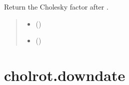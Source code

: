 \documentclass[a4paper,11pt,english]{sphinxmanual}
\begin{document}
\begin{fulllineitems}
\label{\detokenize{generated/cholrot.rank1_update:cholrot.rank1_update}}
\pysigstartsignatures
\pysiglinewithargsret
{}
{\sphinxparamcomma {}\sphinxparamcomma {}}
{}
\pysigstopsignatures
\sphinxAtStartPar
Return the Cholesky factor after .
\begin{quote}\begin{description}
\begin{itemize}
\item {} 
\sphinxAtStartPar
{} ()

\item {} 
\sphinxAtStartPar
{} ()

\end{itemize}

\sphinxAtStartPar
{}

\end{description}\end{quote}

\end{fulllineitems}


\sphinxstepscope


\section{cholrot.downdate}
\label{\detokenize{generated/cholrot.downdate:cholrot-downdate}}\label{\detokenize{generated/cholrot.downdate::doc}}
\end{document}
